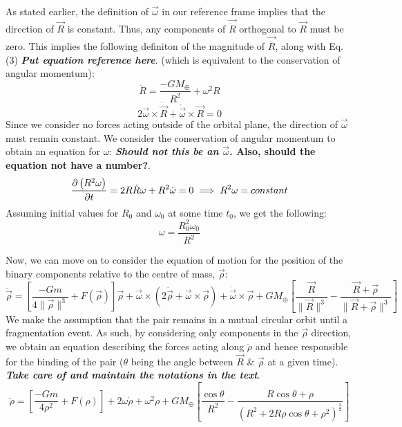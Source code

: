 \documentclass[letterpaper, preprint, paper,11pt]{AAS}	%
\begin{document}
As stated earlier, the definition of $\vec{\omega}$ in our reference frame implies that the direction of $\vec{R}$ is constant. Thus, any components of $\vec{\ddot{R}}$ orthogonal to $\vec{R}$ must be zero. This implies the following definiton of the magnitude of $\vec{\ddot{R}}$, along with Eq. (3) \textbf{\emph{Put equation reference here}}. (which is equivalent to the conservation of angular momentum): 
\begin{equation}
\ddot{R} = \frac{-GM_\oplus}{R^{2}}+\omega^{2}R
\end{equation}
\begin{equation}
2\vec{\omega}\times\dot{\vec{R}}+\dot{\vec{\omega}}\times\vec{R}=0
\end{equation}
Since we consider no forces acting outside of the orbital plane, the direction of $\vec{\omega}$ must remain constant. We consider the conservation of angular momentum to obtain an equation for $\omega$: \textbf{\emph{Should not this be an $\vec{\omega}$}. Also, should the equation not have a number?}.
\begin{equation}
\notag\frac{\partial\left(R^{2}\omega\right)}{\partial t} = 2R\dot{R}\omega + R^{2}\dot{\omega} = 0 \implies R^{2}\omega = constant
\end{equation}
Assuming initial values for $R_0$ and $\omega_0$ at some time $t_0$, we get the following:
\begin{equation}
\omega = \frac{R_0^{2}\omega_0}{R^{2}}
\end{equation}

Now, we can move on to consider the equation of motion for the position of the binary components relative to the centre of mass, $\vec{\rho}$: 
\begin{equation}
\ddot{\vec{\rho}} = \left[\frac{-Gm}{4\|\vec{\rho}\|^{3}}+F(\vec{\rho})\right]\vec{\rho}+\vec{\omega}\times(2\dot{\vec{\rho}}+\vec{\omega}\times\vec{\rho})+\dot{\vec{\omega}}\times\vec{\rho}+{GM_\oplus}\left[\frac{\vec{R}}{\|\vec{R}\|^{3}}-\frac{\vec{R}+\vec{\rho}}{\|\vec{R}+\vec{\rho}\|^{3}}\right]
\end{equation}
We make the assumption that the pair remains in a mutual circular orbit until a fragmentation event. As such, by considering only components in the $\vec{\rho}$ direction, we obtain an equation describing the forces acting along $\ddot{\rho}$ and hence responsible for the binding of the pair ($\theta$ being the angle between $\vec{R}$ \& $\vec{\rho}$ at a given time). \textbf{\emph{Take care of and maintain the notations in the text}}.
\begin{equation}\label{eq:rdd}
\ddot{\rho} = \left[\frac{-Gm}{4\rho^{2}}+F(\rho)\right]+2\omega\dot{\rho}+\omega^{2}\rho+{GM_\oplus}\left[\frac{\cos\theta}{R^{2}}-\frac{R\cos\theta+\rho}{(R^{2}+2R\rho\cos\theta+\rho^{2})^\frac{3}{2}}\right]
\end{equation}
\end{document}
